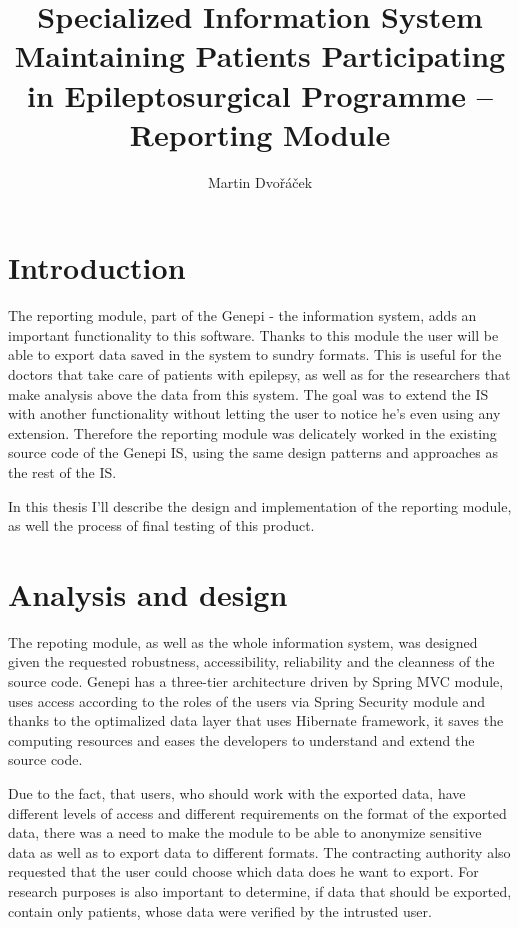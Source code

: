 \documentclass[thesis=B,english]{FITthesis}[2012/10/20]
\title{Specialized Information System Maintaining Patients Participating in Epileptosurgical Programme – Reporting Module}
\author{Martin Dvořáček} %
\begin{document}

\chapter{Introduction}
The reporting module, part of the Genepi - the information system, adds an important functionality to this software. Thanks to this module the user will be able to export data saved in the system to sundry formats. This is useful for the doctors that take care of patients with epilepsy, as well as for the researchers that make analysis above the data from this system. The goal was to extend the IS with another functionality without letting the user to notice he's even using any extension. Therefore the reporting module was delicately worked in the existing source code of the Genepi IS, using the same design patterns and approaches as the rest of the IS.

In this thesis I'll describe the design and implementation of the reporting module, as well the process of final testing of this product.

\chapter{Analysis and design}
The repoting module, as well as the whole information system, was designed given the requested robustness, accessibility, reliability and the cleanness of the source code. Genepi has a three-tier architecture driven by Spring MVC module, uses access according to the roles of the users via Spring Security module and thanks to the optimalized data layer that uses Hibernate framework, it saves the computing resources and eases the developers to understand and extend the source code.

Due to the fact, that users, who should work with the exported data, have different levels of access and different requirements on the format of the exported data, there was a need to make the module to be able to anonymize sensitive data as well as to export data to different formats. The contracting authority also requested that the user could choose which data does he want to export. For research purposes is also important to determine, if data that should be exported, contain only patients, whose data were verified by the intrusted user.
\end{document}
